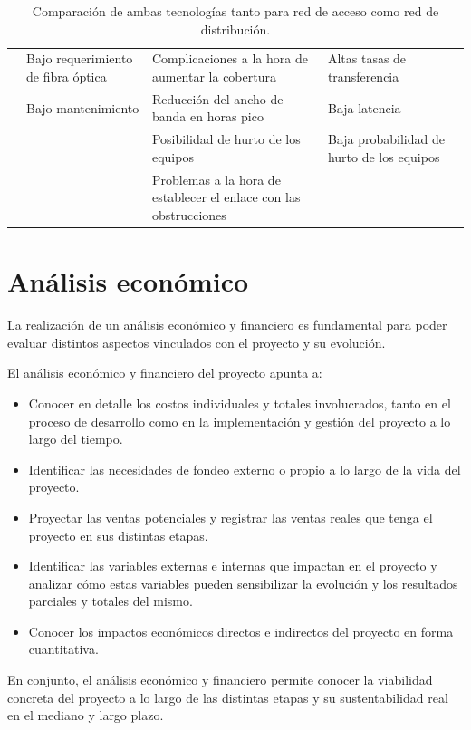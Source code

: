 \documentclass[11pt,a4paper]{article}
\begin{document}
\begin{table}[htbp]
{\begin{tabular}{|c|C{0.25\textwidth}|C{0.25\textwidth}|C{0.25\textwidth}|C{0.25\textwidth}|}
         & Bajo requerimiento de fibra óptica & Complicaciones a la hora de aumentar la cobertura & Altas tasas de transferencia &  \bigstrut\\
         & Bajo mantenimiento & Reducción del ancho de banda en horas pico & Baja latencia &  \bigstrut\\
         &      & Posibilidad de hurto de los equipos & Baja probabilidad de hurto de los equipos &  \bigstrut\\
         &      & Problemas a la hora de establecer el enlace  con las obstrucciones  &      &  \bigstrut\\
    \hline
    \end{tabular}}%
    \caption{Comparación de ambas tecnologías tanto para red de acceso como red de distribución.}
  \label{tab:comp_tec}%
\end{table}%



\part{Análisis económico}

La realización de un análisis económico y financiero es fundamental para poder evaluar distintos aspectos vinculados con el proyecto y su evolución. 

El análisis económico y financiero del proyecto apunta a:

\begin{itemize}
    \item Conocer en detalle los costos individuales y totales involucrados, tanto en el proceso de desarrollo como en la implementación y gestión del proyecto a lo largo del tiempo.
    \item Identificar las necesidades de fondeo externo o propio a lo largo de la vida del proyecto. 
    \item Proyectar las ventas potenciales y registrar las ventas reales que tenga el proyecto en sus distintas etapas. 
    \item Identificar las variables externas e internas que impactan en el proyecto y analizar cómo estas variables pueden sensibilizar la evolución y los resultados parciales y totales del mismo. 
    \item Conocer los impactos económicos directos e indirectos del proyecto en forma cuantitativa.
\end{itemize}

En conjunto, el análisis económico y financiero permite conocer la viabilidad concreta del proyecto a lo largo de las distintas etapas y su sustentabilidad real en el mediano y largo plazo. 
\end{document}
